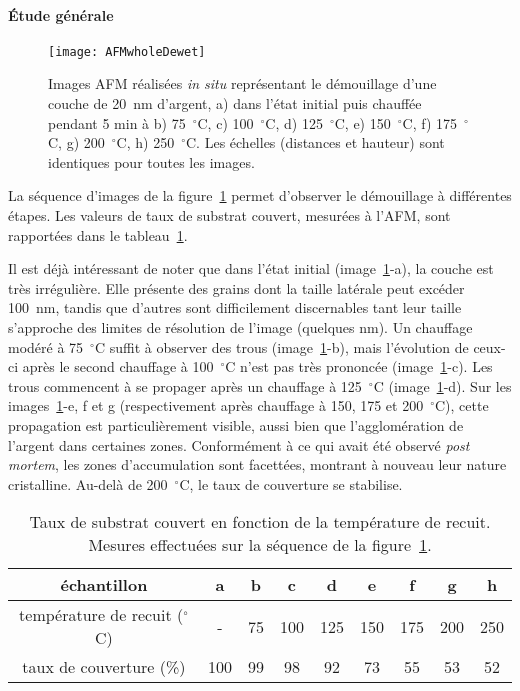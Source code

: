 \paragraph*{Étude générale}
\begin{figure}[!htb]
	\centering
	\texttt{[image: AFMwholeDewet]}
	\caption{Images AFM réalisées \textit{in situ} représentant le démouillage d'une couche de 20~nm d'argent, a) dans l'état initial puis chauffée pendant 5 min à b) 75~$^\circ$C, c) 100~$^\circ$C, d) 125~$^\circ$C, e) 150~$^\circ$C, f) 175~$^\circ$C, g) 200~$^\circ$C, h) 250~$^\circ$C. Les échelles (distances et hauteur) sont identiques pour toutes les images.}
	\label{AFMwhole}
\end{figure}
La séquence d'images de la figure~\ref{AFMwhole} permet d'observer le démouillage à différentes étapes. Les valeurs de taux de substrat couvert, mesurées à l'AFM, sont rapportées dans le tableau~\ref{tTaux}.\par 
Il est déjà intéressant de noter que dans l'état initial (image~\ref{AFMwhole}-a), la couche est très irrégulière. Elle présente des grains dont la taille latérale peut excéder 100~nm, tandis que d'autres sont difficilement discernables tant leur taille s'approche des limites de résolution de l'image (quelques nm). Un chauffage modéré à 75~$^\circ$C suffit à observer des trous (image~\ref{AFMwhole}-b), mais l'évolution de ceux-ci après le second chauffage à 100~$^\circ$C n'est pas très prononcée (image~\ref{AFMwhole}-c). Les trous commencent à se propager après un chauffage à 125~$^\circ$C (image~\ref{AFMwhole}-d). Sur les images~\ref{AFMwhole}-e, f et g (respectivement après chauffage à 150, 175 et 200~$^\circ$C), cette propagation est particulièrement visible, aussi bien que l'agglomération de l'argent dans certaines zones. Conformément à ce qui avait été observé \textit{post mortem}, les zones d'accumulation sont facettées, montrant à nouveau leur nature cristalline. Au-delà de 200~$^\circ$C, le taux de couverture se stabilise.\par

\begin{table}[!htb]
\centering
\begin{tabular}{ccccccccc}
\hline
échantillon & a & b & c & d & e & f & g & h\\
\hline
température de recuit ($^\circ$C) & - & 75 & 100 & 125 & 150 & 175 & 200 & 250\\
taux de couverture (\%) & 100 & 99 & 98 & 92 & 73 & 55 & 53 & 52 \\
\hline
\end{tabular}
\caption{Taux de substrat couvert en fonction de la température de recuit. Mesures effectuées sur la séquence de la figure~\ref{AFMwhole}.}
\label{tTaux}
\end{table}


